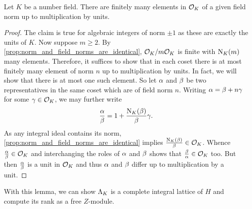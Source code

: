     \begin{lemma}\label{lem:finitely_many_elements_of_fixed_norm}
      Let \(K\) be a number field. There are finitely many elements in \(\mathcal{O}_{K}\) of a given field norm up to multiplication by units.
    \end{lemma}
    \begin{proof}
      The claim is true for algebraic integers of norm \(\pm 1\) as these are exactly the units of \(K\). Now suppose \(m \ge 2\). By \cref{prop:norm_and_field_norms_are_identical}, \(\mathcal{O}_{K}/m\mathcal{O}_{K}\) is finite with \(\operatorname{\mathrm{N}}_{K}(m)\) many elements. Therefore, it suffices to show that in each coset there is at most finitely many element of norm \(n\) up to multiplication by units. In fact, we will show that there is at most one such element. So let \(\alpha\) and \(\beta\) be two representatives in the same coset which are of field norm \(n\). Writing \(\alpha = \beta+n\gamma\) for some \(\gamma \in \mathcal{O}_{K}\), we may further write
      \[
        \frac{\alpha}{\beta} = 1+\frac{\operatorname{\mathrm{N}}_{K}(\beta)}{\beta}\gamma.
      \]
      As any integral ideal contains its norm, \cref{prop:norm_and_field_norms_are_identical} implies \(\frac{\operatorname{\mathrm{N}}_{K}(\beta)}{\beta} \in \mathcal{O}_{K}\). Whence \(\frac{\alpha}{\beta} \in \mathcal{O}_{K}\) and interchanging the roles of \(\alpha\) and \(\beta\) shows that \(\frac{\beta}{\alpha} \in \mathcal{O}_{K}\) too. But then \(\frac{\alpha}{\beta}\) is a unit in \(\mathcal{O}_{K}\) and thus \(\alpha\) and \(\beta\) differ up to multiplication by a unit.
    \end{proof}

    With this lemma, we can show \(\Lambda_{K}\) is a complete integral lattice of \(H\) and compute its rank as a free \(Z\)-module.

